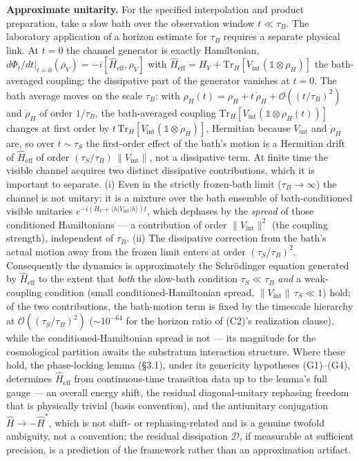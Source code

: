 \documentclass[
]{article}
\begin{document}
\textbf{Approximate unitarity.} For the specified interpolation and
product preparation, take a slow bath over the observation window
\(t\ll\tau_B\). The laboratory application of a horizon estimate for
\(\tau_B\) requires a separate physical link. At \(t=0\) the channel
generator is exactly Hamiltonian,
\(d\Phi_t/dt|_{t=0}(\rho_V) = -i[\hat{H}_{\text{eff}}, \rho_V]\) with
\(\hat{H}_{\text{eff}} = H_V + \mathrm{Tr}_H[V_{\text{int}}(\mathbb{1}\otimes\rho_H)]\)
the bath-averaged coupling; the dissipative part of the generator
vanishes at \(t=0\). The bath average moves on the scale \(\tau_B\):
with \(\rho_H(t) = \rho_H + t\,\dot\rho_H + \mathcal{O}((t/\tau_B)^2)\)
and \(\dot\rho_H\) of order \(1/\tau_B\), the bath-averaged coupling
\(\mathrm{Tr}_H[V_{\text{int}}(\mathbb{1}\otimes\rho_H(t))]\) changes at
first order by
\(t\,\mathrm{Tr}_H[V_{\text{int}}(\mathbb{1}\otimes\dot\rho_H)]\),
Hermitian because \(V_{\text{int}}\) and \(\dot\rho_H\) are, so over
\(t \sim \tau_S\) the first-order effect of the bath's motion is a
Hermitian drift of \(\hat{H}_{\text{eff}}\) of order
\((\tau_S/\tau_B)\,\|V_{\text{int}}\|\), not a dissipative term. At
finite time the visible channel acquires two distinct dissipative
contributions, which it is important to separate. (i) Even in the
strictly frozen-bath limit (\(\tau_B\to\infty\)) the channel is not
unitary: it is a mixture over the bath ensemble of bath-conditioned
visible unitaries \(e^{-i(H_V + \langle h|V_{\text{int}}|h\rangle)t}\),
which dephases by the \emph{spread} of those conditioned Hamiltonians
--- a contribution of order \(\|V_{\text{int}}\|^2\) (the coupling
strength), independent of \(\tau_B\). (ii) The dissipative correction
from the bath's actual motion away from the frozen limit enters at order
\((\tau_S/\tau_B)^2\). Consequently the dynamics is approximately the
Schrödinger equation generated by \(\hat{H}_{\text{eff}}\) to the extent
that \emph{both} the slow-bath condition \(\tau_S\ll\tau_B\) \emph{and}
a weak-coupling condition (small conditioned-Hamiltonian spread,
\(\|V_{\text{int}}\|\,\tau_S \ll 1\)) hold; of the two contributions,
the bath-motion term is fixed by the timescale hierarchy at
\(\mathcal{O}((\tau_S/\tau_B)^2)\) (\(\sim 10^{-64}\) for the horizon
ratio of (C2)'s realization clause), while the conditioned-Hamiltonian
spread is not --- its magnitude for the cosmological partition awaits
the substratum interaction structure. Where these hold, the
phase-locking lemma (§3.1), under its genericity hypotheses (G1)--(G4),
determines \(\hat{H}_{\text{eff}}\) from continuous-time transition data
up to the lemma's full gauge --- an overall energy shift, the residual
diagonal-unitary rephasing freedom that is physically trivial (basis
convention), and the antiunitary conjugation \(\hat{H} \to -\hat{H}^*\),
which is not shift- or rephasing-related and is a genuine twofold
ambiguity, not a convention; the residual dissipation \(\mathcal{D}\),
if measurable at sufficient precision, is a prediction of the framework
rather than an approximation artifact.
\end{document}

